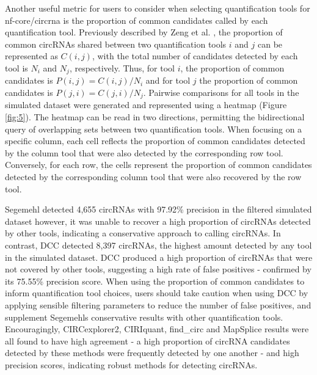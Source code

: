 \documentclass{bmcart}
\begin{document}
Another useful metric for users to consider when selecting quantification tools for nf-core/circrna is the proportion of common candidates called by each quantification tool. Previously described by Zeng et al. \cite{Zeng2017Jun}, the proportion of common circRNAs shared between two quantification tools $i$ and $j$ can be represented as $C(i,j)$, with the total number of candidates detected by each tool is $N_i$ and $N_j$, respectively. Thus, for tool $i$, the proportion of common candidates is $P(i,j) = C(i,j)/N_i$ and for tool $j$ the proportion of common candidates is $P(j,i) = C(j,i)/N_j$. Pairwise comparisons for all tools in the simulated dataset were generated and represented using a heatmap (Figure \ref{fig:5}). The heatmap can be read in two directions, permitting the bidirectional query of overlapping sets between two quantification tools. When focusing on a specific column, each cell reflects the proportion of common candidates detected by the column tool that were also detected by the corresponding row tool. Conversely, for each row, the cells represent the proportion of common candidates detected by the corresponding column tool that were also recovered by the row tool. \par
Segemehl detected 4,655 circRNAs with 97.92\% precision in the filtered simulated dataset however, it was unable to recover a high proportion of circRNAs detected by other tools, indicating a conservative approach to calling circRNAs. In contrast, DCC detected 8,397 circRNAs, the highest amount detected by any tool in the simulated dataset. DCC produced a high proportion of circRNAs that were not covered by other tools, suggesting a high rate of false positives - confirmed by its 75.55\% precision score. When using the proportion of common candidates to inform quantification tool choices, users should take caution when using DCC by applying sensible filtering parameters to reduce the number of false positives, and supplement Segemehls conservative results with other quantification tools. Encouragingly, CIRCexplorer2, CIRIquant, find\_circ and MapSplice results were all found to have high agreement - a high proportion of circRNA candidates detected by these methods were frequently detected by one another - and high precision scores, indicating robust methods for detecting circRNAs.
\end{document}
